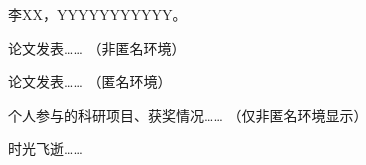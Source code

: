 \ifgraduate
\begin{resume}
  李XX，YYYYYYYYYYY。
\end{resume}

\begin{publications}
  论文发表…… （非匿名环境）
\end{publications}

\begin{publications*}
  论文发表…… （匿名环境）
\end{publications*}



\begin{projects}
  个人参与的科研项目、获奖情况…… （仅非匿名环境显示）
\end{projects}
\fi


\begin{acknowledgement}
    时光飞逝……

\end{acknowledgement}